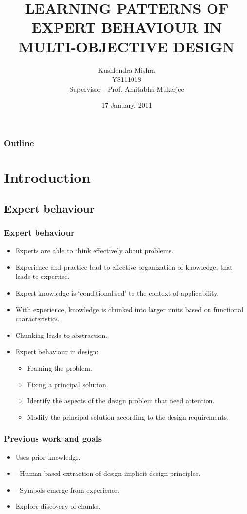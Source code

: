 \documentclass[svgnames, table, smaller]{beamer}
\title[Learning Patterns of Expert Behaviour In Design]{LEARNING PATTERNS OF EXPERT BEHAVIOUR IN MULTI-OBJECTIVE DESIGN}
\author[Kushlendra Mishra]{Kushlendra Mishra \\ Y8111018 \\{\small   Supervisor - Prof. Amitabha Mukerjee}}
\institute[IIT Kanpur]{DEPARTMENT OF COMPUTER SCIENCE AND ENGINEERING,\\ INDIAN INSTITUTE OF TECHNOLOGY KANPUR}
\date{17 January, 2011}
\begin{document}
\begin{frame}
\titlepage
\end{frame}

\begin{frame}
  \frametitle{Outline}
  \tableofcontents
\end{frame}   

\section{Introduction}

\subsection{Expert behaviour}

\begin{frame}
  \frametitle{Expert behaviour}

  \begin{itemize}
  \item Experts are able to think effectively about problems.
  \item Experience and practice lead to effective organization of
    knowledge, that leads to expertise.
  \item Expert knowledge is `conditionalised' to the context of
    applicability.
  \item With experience, knowledge is chunked into larger units based on
    functional characteristics.
  \item Chunking leads to abstraction.
  \item Expert behaviour in design:
    \begin{itemize}
    \item Framing the problem.
    \item Fixing a principal solution.
    \item Identify the aspects of the design problem that need attention.
    \item Modify the principal solution according to the design requirements.
    \end{itemize}
  \end{itemize}
\end{frame}

\begin{frame}
  \frametitle{Previous work and goals}
  \begin{itemize}
  \item  \cite{moss04} Uses prior knowledge.
  \item \cite{deb10} - Human based extraction of design implicit design principles.
  \item  \cite{mukerjee09} - Symbols emerge from experience.
  \end{itemize}
  
  \begin{itemize}
  \item Explore discovery of chunks.
  \end{itemize}
    
\end{frame}      
\end{document}
